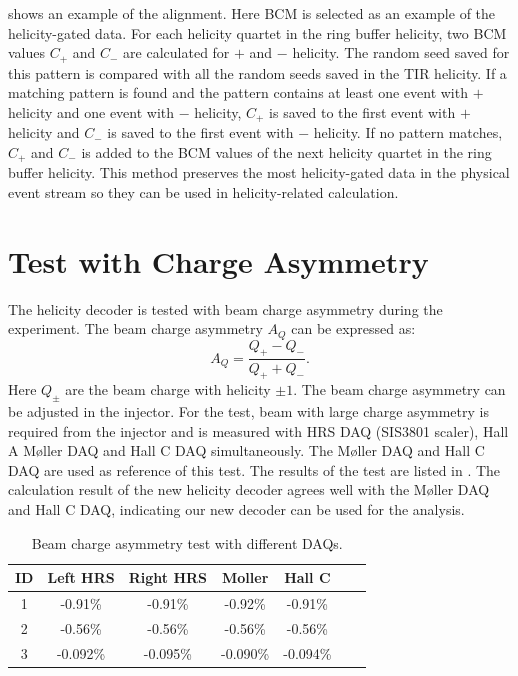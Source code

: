  shows an example of the alignment. Here BCM is selected as an example of the helicity-gated data. For each helicity quartet in the ring buffer helicity, two BCM values $C_{+}$ and $C_{-}$ are calculated for $+$ and $-$ helicity. The random seed saved for this pattern is compared with all the random seeds saved in the TIR helicity. If a matching pattern is found and the pattern contains at least one event with $+$ helicity and one event with $-$ helicity, $C_{+}$ is saved to the first event with $+$ helicity and $C_{-}$ is saved to the first event with $-$ helicity. If no pattern matches, $C_{+}$ and $C_{-}$ is added to the BCM values of the next helicity quartet in the ring buffer helicity. This method preserves the most helicity-gated data in the physical event stream so they can be used in helicity-related calculation.

\section{Test with Charge Asymmetry}
\label{A1S3}

The helicity decoder is tested with beam charge asymmetry during the experiment. The beam charge asymmetry $A_{Q}$ can be expressed as:
\begin{equation} \label{A1S3E1}
A_{Q}=\frac{Q_{+}-Q_{-}}{Q_{+}+Q_{-}}.
\end{equation}
Here $Q_{\pm}$ are the beam charge with helicity $\pm 1$. The beam charge asymmetry can be adjusted in the injector. For the test, beam with large charge asymmetry is required from the injector and is measured with HRS DAQ (SIS3801 scaler), Hall A M{\o}ller DAQ and Hall C DAQ simultaneously. The M{\o}ller DAQ and Hall C DAQ are used as reference of this test. The results of the test are listed in . The calculation result of the new helicity decoder agrees well with the M{\o}ller DAQ and Hall C DAQ, indicating our new decoder can be used for the analysis.

\begin{table}[h!]
  \centering
  \begin{tabular}{|*{7}{c|}}
    \hline
    ID & Left HRS & Right HRS & Moller & Hall C \\ \hline
    1 & -0.91\% & -0.91\% & -0.92\% & -0.91\% \\ \hline
    2 & -0.56\% & -0.56\% & -0.56\% & -0.56\% \\ \hline
    3 & -0.092\% & -0.095\% & -0.090\% & -0.094\% \\ \hline
  \end{tabular}
  \caption{Beam charge asymmetry test with different DAQs. \label{A1S3T1}}
\end{table}

\clearpage
\newpage


